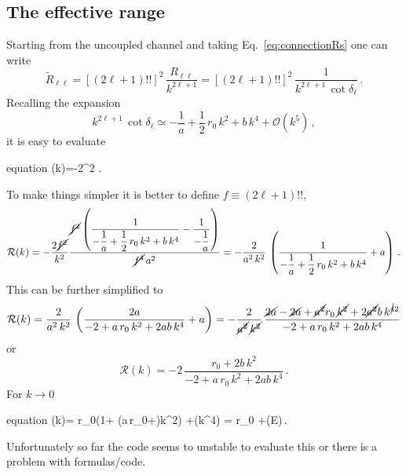 \documentclass[10pt,a4paper]{article}
\newcommand{\eq}[1]{Eq.~#1}
\begin{document}
		
		
		
	\subsection{The effective range}
	Starting from the uncoupled channel and taking \eq{\eqref{eq:connectionRs}} one can write
	\begin{equation}
		\tilde{R}_{\ell\ell}=
		\left[(2\ell+1)!!\right]^2\,
		\frac{R_{\ell\ell}}{k^{2\ell+1}}
		=
		\left[(2\ell+1)!!\right]^2\,
		\frac{1}{k^{2\ell+1}\,\cot \delta_\ell}
		\,.
	\end{equation}
	Recalling the expansion
	\begin{equation}
		k^{2\ell+1}\,\cot \delta_\ell \simeq 
		-\frac{1}{a} + \frac{1}{2}\,r_0\,k^2
		+ b\,k^4 +\mathcal{O}(k^5)\,,
	\end{equation}
	it is easy to evaluate
	\begin{empheq}[box=\mymathUtil]{equation}
		(k)=-2^2\,\,.
	\end{empheq}
	To make things simpler it is better to define $f\equiv(2\ell+1)!!$, 
	\begin{equation}
		\mathcal{R}(k)
		=
		-\frac{2\cancel{f^2}}{k^2}\frac{\cancel{f^2}\left(\dfrac{1}{-\dfrac{1}{a} + \dfrac{1}{2}\,r_0\,k^2
		+ b\,k^4}-\dfrac{1}{-\dfrac{1}{a}}\right)}{\cancel{f^4}\,a^2}
		=
		-\frac{2}{a^2\,k^2}\,\left(
		\dfrac{1}{-\dfrac{1}{a} + \dfrac{1}{2}\,r_0\,k^2
			+ b\,k^4} +a
		\right)\,.
	\end{equation}
	This can be further simplified to
	\begin{equation}
		\mathcal{R}(k)=
		\frac{2}{a^2\,k^2}\,\left(
		\frac{2a}{-2+a\,r_0\,k^2+2ab\,k^4}
			+ a
		\right)
		=
		-\frac{2}{\cancel{a^2}\,\cancel{k^2}}\,
		\frac{\cancel{2a}-\cancel{2a}+\cancel{a^2}r_0\,\cancel{k^2}+2\cancel{a^2}b\,k^{\cancel{4}2}}{-2+a\,r_0\,k^2+2ab\,k^4}
	\end{equation}
	or
	\begin{equation}
		\mathcal{R}(k)
		=
		-2\,
		\frac{r_0+2b\,k^2}{-2+a\,r_0\,k^2+2ab\,k^4}\,.
	\end{equation}
	For $k\rightarrow 0$ 
	\begin{empheq}[box=\mymath]{equation}
		(k)= r_0\left(1+ \left(a\,r_0+\right)k^2\right) +(k^4) = r_0 +(E)\,.
	\end{empheq}
	Unfortunately so far the code seems to unstable to evaluate this or there is a problem with formulas/code.
	
\end{document}
